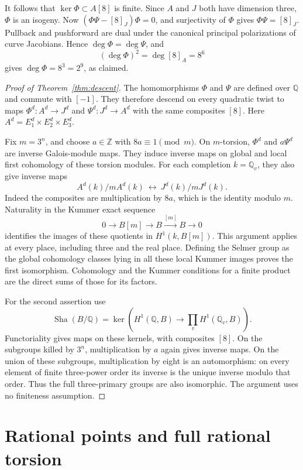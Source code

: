 \documentclass[11pt,reqno]{amsart}
\theoremstyle{remark}
\newcommand{\Q}{\mathbb Q}
\newcommand{\Z}{\mathbb Z}
\DeclareMathOperator{\Sha}{Sha}
\begin{document}
It follows that \(\ker\Phi\subset A[8]\) is finite. Since \(A\)
and \(J\) both have dimension three, \(\Phi\) is an isogeny.
Now \((\Phi\Psi-[8]_J)\Phi=0\), and surjectivity of \(\Phi\)
gives \(\Phi\Psi=[8]_J\). Pullback and pushforward are dual
under the canonical principal polarizations of curve Jacobians.
Hence \(\deg\Phi=\deg\Psi\), and
\[
 (\deg\Phi)^2=\deg[8]_A=8^6
\]
gives \(\deg\Phi=8^3=2^9\), as claimed.

\begin{proof}[Proof of Theorem~\ref{thm:descent}]
The homomorphisms \(\Phi\) and \(\Psi\) are defined over \(\Q\)
and commute with \([-1]\). They therefore descend on every
quadratic twist to maps \(\Phi^d:A^d\to J^d\) and
\(\Psi^d:J^d\to A^d\) with the same composites \([8]\).
Here \(A^d=E_1^d\times E_2^d\times E_3^d\).

Fix \(m=3^n\), and choose \(a\in\Z\) with \(8a\equiv1\pmod m\).
On \(m\)-torsion, \(\Phi^d\) and \(a\Psi^d\) are inverse
Galois-module maps. They induce inverse maps on global and
local first cohomology of these torsion modules.
For each completion \(k=\Q_v\), they also give inverse maps
\[
 A^d(k)/mA^d(k)\ \longleftrightarrow\ J^d(k)/mJ^d(k).
\]
Indeed the composites are multiplication by \(8a\), which is the
identity modulo \(m\). Naturality in the Kummer exact sequence
\[
 0\longrightarrow B[m]\longrightarrow B
 \xrightarrow{[m]}B\longrightarrow0
\]
identifies the images of these quotients in \(H^1(k,B[m])\).
This argument applies at every place, including three and the real
place. Defining the Selmer group as the global cohomology classes
lying in all these local Kummer images proves the first isomorphism.
Cohomology and the Kummer conditions for a finite product are the
direct sums of those for its factors.

For the second assertion use
\[
 \Sha(B/\Q)=\ker\left(H^1(\Q,B)\longrightarrow
                              \prod_v H^1(\Q_v,B)\right).
\]
Functoriality gives maps on these kernels, with composites \([8]\).
On the subgroups killed by \(3^n\), multiplication by \(a\)
again gives inverse maps. On the union of these subgroups,
multiplication by eight is an automorphism: on every element
of finite three-power order its inverse is the unique inverse
modulo that order. Thus the full three-primary groups are also
isomorphic. The argument uses no finiteness assumption.
\end{proof}

\section{Rational points and full rational torsion}
\end{document}
